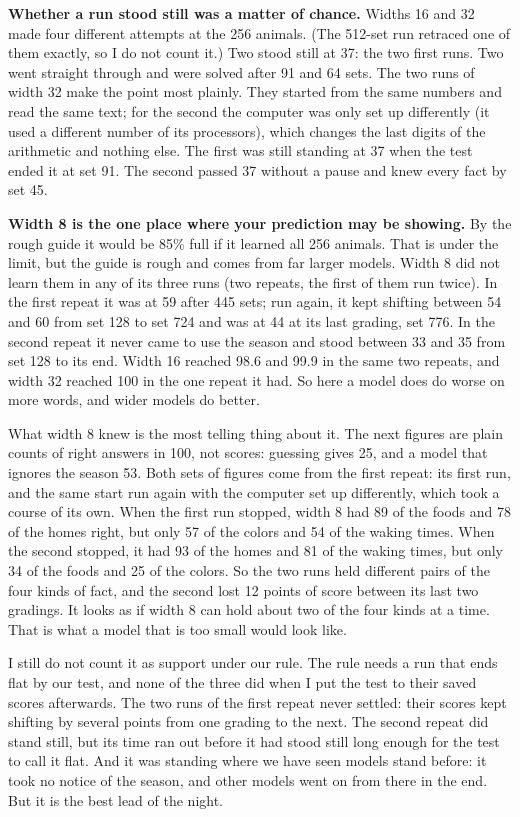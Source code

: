 \textbf{Whether a run stood still was a matter of chance.} Widths 16 and 32 made four different
attempts at the 256 animals. (The 512-set run retraced one of them exactly, so I do not count
it.) Two stood still at 37: the two first runs. Two went straight through and were solved
after 91 and 64 sets. The two runs of width 32 make the point most plainly. They started from
the same numbers and read the same text; for the second the computer was only set up
differently (it used a different number of its processors), which changes the last digits of
the arithmetic and nothing else. The first
was still standing at 37 when the test ended it at set 91. The second passed 37 without a
pause and knew every fact by set 45.

\textbf{Width 8 is the one place where your prediction may be showing.} By the rough guide it
would be 85\% full if it learned all 256 animals. That is under the limit, but the guide is
rough and comes from far larger models. Width 8 did not learn them in any of its three runs
(two repeats, the first of them run twice). In the first repeat it was at 59 after 445 sets;
run again, it kept shifting between 54 and 60 from set 128 to set 724 and was at 44 at its
last grading, set 776. In the second repeat it never came to use the season and stood between
33 and 35 from set 128 to its end. Width 16 reached 98.6 and 99.9 in the same two repeats, and
width 32 reached 100 in the one repeat it had. So here a model does do worse on more words, and wider models do better.

What width 8 knew is the most telling thing about it. The next figures are plain counts of
right answers in 100, not scores: guessing gives 25, and a model that ignores the season 53.
Both sets of figures come from the first repeat: its first run, and the same start run again
with the computer set up differently, which took a course of its own. When the first run
stopped, width 8 had 89 of the foods and 78 of the homes right, but only 57 of the colors and
54 of the waking times. When the second stopped, it had 93 of the homes and 81 of the waking
times, but only 34 of the foods and 25 of the colors. So the two runs held different pairs of
the four kinds of fact, and the second lost 12 points of score between its last two gradings.
It looks as if width 8 can hold about two of the four kinds at a time. That is what a model
that is too small would look like.

I still do not count it as support under our rule. The rule needs a run that ends flat by our
test, and none of the three did when I put the test to their saved scores afterwards. The two
runs of the first repeat never settled: their scores kept shifting by several points from one
grading to the next. The
second repeat did stand still, but its time ran out before it had stood still long enough for
the test to call it flat. And it was standing where we have seen models stand before: it took
no notice of the season, and other models went on from there in the end. But it is the best
lead of the night.

